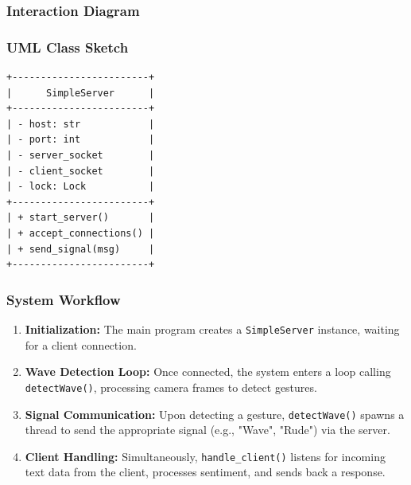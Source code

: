 \documentclass[conference]{IEEEtran}
\begin{document}
\subsubsection{Interaction Diagram}

\begin{center}
\end{center}

\subsubsection{UML Class Sketch}

\begin{verbatim}
+------------------------+
|      SimpleServer      |
+------------------------+
| - host: str            |
| - port: int            |
| - server_socket        |
| - client_socket        |
| - lock: Lock           |
+------------------------+
| + start_server()       |
| + accept_connections() |
| + send_signal(msg)     |
+------------------------+
\end{verbatim}

\subsubsection{System Workflow}

\begin{enumerate}
  \item \textbf{Initialization:} The main program creates a \texttt{SimpleServer} instance, waiting for a client connection.
  \item \textbf{Wave Detection Loop:} Once connected, the system enters a loop calling \texttt{detectWave()}, processing camera frames to detect gestures.
  \item \textbf{Signal Communication:} Upon detecting a gesture, \texttt{detectWave()} spawns a thread to send the appropriate signal (e.g., "Wave", "Rude") via the server.
  \item \textbf{Client Handling:} Simultaneously, \texttt{handle\_client()} listens for incoming text data from the client, processes sentiment, and sends back a response.
\end{enumerate}
\end{document}
